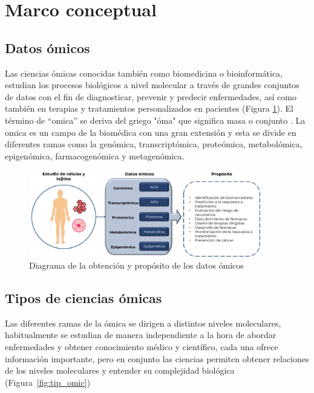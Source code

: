 \section{Marco conceptual}

\subsection{Datos ómicos}

Las ciencias ómicas conocidas también como biomedicina o bioinformática, estudian los procesos biológicos a nivel molecular a través de grandes conjuntos de datos con el fin de diagnosticar, prevenir y predecir enfermedades, así como también en terapias y tratamientos personalizados en pacientes (Figura \ref{fig:dat_omic}). El término de “omica” se deriva del griego "óma" que significa masa o conjunto \citep{ravi2016deep,mamoshina2016applications}. La omica es un campo de la biomédica con una gran extensión y esta se divide en diferentes ramas como la genómica, transcriptómica, proteómica, metabolómica, epigenómica, farmacogenómica y metagenómica.

\begin{figure}[h!]
    \centering
    \includegraphics[width=0.9\textwidth]{Imagenes/Datos_omicos.png}
    \caption{Diagrama de la obtención y propósito de los datos ómicos}
    \label{fig:dat_omic}
\end{figure}

\subsection{Tipos de ciencias ómicas}

Las diferentes ramas de la ómica se dirigen a distintos niveles moleculares, habitualmente se estudian de manera independiente a la hora de abordar enfermedades y obtener conocimiento médico y científico, cada una ofrece información importante, pero en conjunto las ciencias permiten obtener relaciones de los niveles moleculares y entender su complejidad biológica (Figura~\ref{fig:tip_omic})

